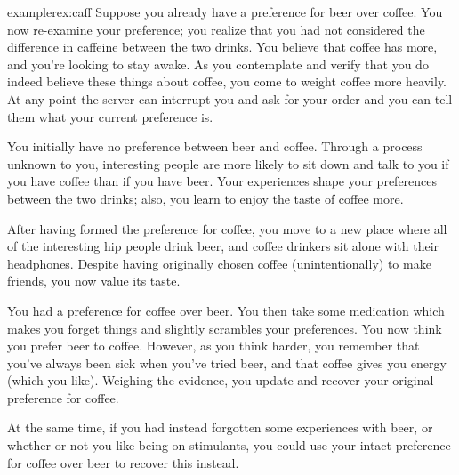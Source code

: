 \documentclass{article}
\begin{document}
	\begin{restatable}{example}{rex:caff} \label{rex:caff}
		Suppose you already have a preference for beer over coffee. You now re-examine your preference; you realize that you had not considered the difference in caffeine between the two drinks. You believe that coffee has more, and you're looking to stay awake. As you contemplate and verify that you do indeed believe these things about coffee, you come to weight coffee more heavily. At any point the server can interrupt you and ask for your order and you can tell them what your current preference is.
	\end{restatable}

	\begin{example}
		You initially have no preference between beer and coffee. Through a process unknown to you, interesting people are more likely to sit down and talk to you if you have coffee than if you have beer. Your experiences shape your preferences between the two drinks; also, you learn to enjoy the taste of coffee more.
		
		After having formed the preference for coffee, you move to a new place where all of the interesting hip people drink beer, and coffee drinkers sit alone with their headphones. Despite having originally chosen coffee (unintentionally) to make friends, you now value its taste. 
	\end{example}

	\begin{example}
		You had a preference for coffee over beer. You then take some medication which makes you forget things and slightly scrambles your preferences. You now think you prefer beer to coffee. However, as you think harder, you remember that you've always been sick when you've tried beer, and that coffee gives you energy (which you like). Weighing the evidence, you  update and recover your original preference for coffee.
		
		At the same time, if you had instead forgotten some experiences with beer, or whether or not you like being on stimulants, you could use your intact preference for coffee over beer to recover this instead.
	\end{example}
\end{document}
